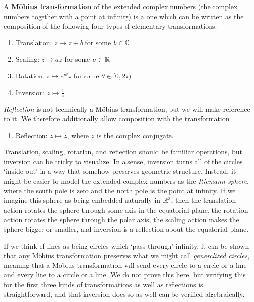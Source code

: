 \begin{definition}
A \textbf{M\"obius transformation} of the extended complex numbers (the complex numbers together with a point at infinity) is a one which can be written as the composition of the following four types of elementary transformations:


\begin{enumerate}
	\item[] Translation: $z\mapsto z+b$ for some $b\in \mathbb{C}$
	\item[] Scaling: $z\mapsto az$ for some $a\in \mathbb{R}$
	\item[] Rotation: $z\mapsto e^{i\theta}z$ for some $\theta\in [0,2\pi)$
	\item[] Inversion: $z \mapsto \tfrac{1}{z}$
	
\end{enumerate}


\textit{Reflection} is not technically a M\"obius transformation, but we will make reference to it.  We therefore additionally allow composition with the transformation
\begin{enumerate}
	\item[] Reflection: $z\mapsto \bar{z}$, where $\bar{z}$ is the complex conjugate.
\end{enumerate}


\end{definition}


Translation, scaling, rotation, and reflection should be familiar operations, but inversion can be tricky to visualize.  In a sense, inversion turns all of the circles `inside out' in a way that somehow preserves geometric structure.  Instead, it might be easier to model the extended complex numbers as the \textit{Riemann sphere}, where the south pole is zero and the north pole is the point at infinity.  If we imagine this sphere as being embedded naturally in $\mathbb{R}^3$, then the translation action rotates the sphere through some axis in the equatorial plane, the rotation action rotates the sphere through the polar axis, the scaling action makes the sphere bigger or smaller, and inversion is a reflection about the equatorial plane. 


If we think of lines as being circles which `pass through' infinity, it can be shown that any M\"obius transformation preserves what we might call \textit{generalized circles}, meaning that a M\"obius transformation will send every circle to a circle or a line and every line to a circle or a line.  We do not prove this here, but verifying this for the first three kinds of transformations as well as reflections is straightforward, and that inversion does so as well can be verified algebraically. 

